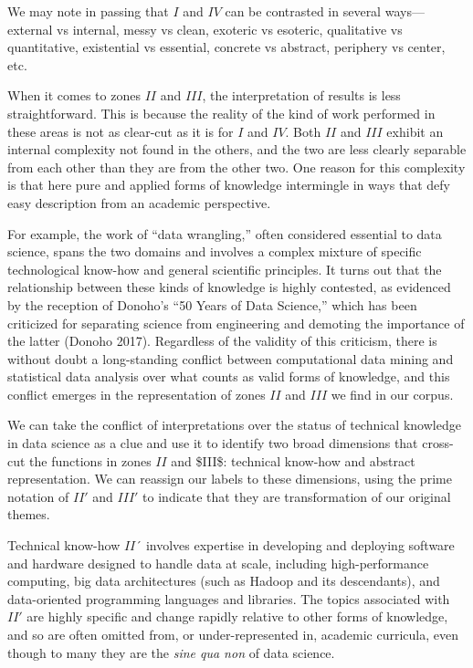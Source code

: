 \documentclass[
  letterpaper,
]{report}
\begin{document}
We may note in passing that \(I\) and \(IV\) can be contrasted in
several ways---external vs internal, messy vs clean, exoteric vs
esoteric, qualitative vs quantitative, existential vs essential,
concrete vs abstract, periphery vs center, etc.

When it comes to zones \(II\) and \(III\), the interpretation of results
is less straightforward. This is because the reality of the kind of work
performed in these areas is not as clear-cut as it is for \(I\) and
\(IV\). Both \(II\) and \(III\) exhibit an internal complexity not found
in the others, and the two are less clearly separable from each other
than they are from the other two. One reason for this complexity is that
here pure and applied forms of knowledge intermingle in ways that defy
easy description from an academic perspective.

For example, the work of ``data wrangling,'' often considered essential
to data science, spans the two domains and involves a complex mixture of
specific technological know-how and general scientific principles. It
turns out that the relationship between these kinds of knowledge is
highly contested, as evidenced by the reception of Donoho's ``50 Years
of Data Science,'' which has been criticized for separating science from
engineering and demoting the importance of the latter (Donoho 2017).
Regardless of the validity of this criticism, there is without doubt a
long-standing conflict between computational data mining and statistical
data analysis over what counts as valid forms of knowledge, and this
conflict emerges in the representation of zones \(II\) and \(III\) we
find in our corpus.

We can take the conflict of interpretations over the status of technical
knowledge in data science as a clue and use it to identify two broad
dimensions that cross-cut the functions in zones \(II\) and \$III\$:
technical know-how and abstract representation. We can reassign our
labels to these dimensions, using the prime notation of \(II'\) and
\(III'\) to indicate that they are transformation of our original
themes.

Technical know-how \(II´\) involves expertise in developing and
deploying software and hardware designed to handle data at scale,
including high-performance computing, big data architectures (such as
Hadoop and its descendants), and data-oriented programming languages and
libraries. The topics associated with \(II'\) are highly specific and
change rapidly relative to other forms of knowledge, and so are often
omitted from, or under-represented in, academic curricula, even though
to many they are the \emph{sine qua non} of data science.
\end{document}
